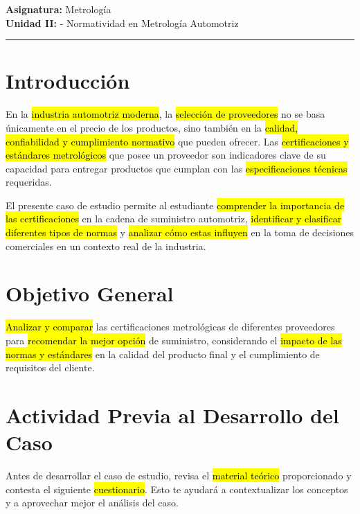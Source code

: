 \documentclass{article}
\begin{document}
	
	
	\textbf{Asignatura:} Metrología \\
	\textbf{Unidad II:} - Normatividad en Metrología Automotriz 
	
	\vspace{5mm}
	\hrule
	\vspace{5mm}
\section*{Introducción}

En la \hl{industria automotriz moderna}, la \hl{selección de proveedores} no se basa únicamente en el precio de los productos, sino también en la \hl{calidad, confiabilidad y cumplimiento normativo} que pueden ofrecer. Las \hl{certificaciones y estándares metrológicos} que posee un proveedor son indicadores clave de su capacidad para entregar productos que cumplan con las \hl{especificaciones técnicas} requeridas.

El presente caso de estudio permite al estudiante \hl{comprender la importancia de las certificaciones} en la cadena de suministro automotriz, \hl{identificar y clasificar diferentes tipos de normas} y \hl{analizar cómo estas influyen} en la toma de decisiones comerciales en un contexto real de la industria.

\section*{Objetivo General}

\hl{Analizar y comparar} las certificaciones metrológicas de diferentes proveedores para \hl{recomendar la mejor opción} de suministro, considerando el \hl{impacto de las normas y estándares} en la calidad del producto final y el cumplimiento de requisitos del cliente.

\section*{Actividad Previa al Desarrollo del Caso}

Antes de desarrollar el caso de estudio, revisa el \hl{material teórico} proporcionado y contesta el siguiente \hl{cuestionario}. Esto te ayudará a contextualizar los conceptos y a aprovechar mejor el análisis del caso.
\end{document}
